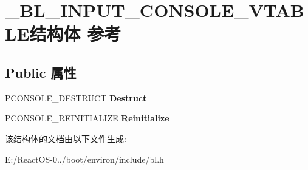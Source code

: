 \hypertarget{struct___b_l___i_n_p_u_t___c_o_n_s_o_l_e___v_t_a_b_l_e}{}\section{\+\_\+\+B\+L\+\_\+\+I\+N\+P\+U\+T\+\_\+\+C\+O\+N\+S\+O\+L\+E\+\_\+\+V\+T\+A\+B\+L\+E结构体 参考}
\label{struct___b_l___i_n_p_u_t___c_o_n_s_o_l_e___v_t_a_b_l_e}
\subsection*{Public 属性}
\begin{DoxyCompactItemize}
\item 
\mbox{\label{struct___b_l___i_n_p_u_t___c_o_n_s_o_l_e___v_t_a_b_l_e_a85d97c800c4cddb09f04c2e19f0fa231}} 
P\+C\+O\+N\+S\+O\+L\+E\+\_\+\+D\+E\+S\+T\+R\+U\+CT {\bfseries Destruct}
\item 
\mbox{\label{struct___b_l___i_n_p_u_t___c_o_n_s_o_l_e___v_t_a_b_l_e_a202583c18e982368087af57a3f6104d4}} 
P\+C\+O\+N\+S\+O\+L\+E\+\_\+\+R\+E\+I\+N\+I\+T\+I\+A\+L\+I\+ZE {\bfseries Reinitialize}
\end{DoxyCompactItemize}


该结构体的文档由以下文件生成\+:\begin{DoxyCompactItemize}
\item 
E\+:/\+React\+O\+S-\/0../boot/environ/include/bl.\+h\end{DoxyCompactItemize}
